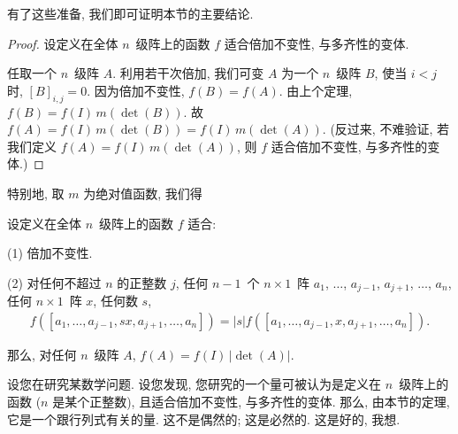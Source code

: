 \documentclass[../libro.tex]{subfiles}
\begin{document}
有了这些准备, 我们即可证明本节的主要结论.

\begin{proof}
    设定义在全体 \(n\)~级阵上的函数 \(f\)
    适合倍加不变性, 与多齐性的变体.

    任取一个 \(n\)~级阵 \(A\).
    利用若干次倍加,
    我们可变 \(A\) 为一个 \(n\)~级阵 \(B\),
    使当 \(i < j\) 时, \([B]_{i,j} = 0\).
    因为倍加不变性, \(f(B) = f(A)\).
    由上个定理, \(f(B) = f(I)\, m(\det {(B)})\).
    故 \(f(A) = f(I)\, m(\det {(B)})
    = f(I)\, m(\det {(A)})\).
    (反过来, 不难验证, 若我们定义 %
    \(f(A) = f(I)\, m(\det {(A)})\),
    则 \(f\) 适合倍加不变性, 与多齐性的变体.) %
\end{proof}

特别地, 取 \(m\) 为绝对值函数, 我们得

\begin{theorem}
    设定义在全体 \(n\)~级阵上的函数 \(f\) 适合:

    (1)
    倍加不变性.

    (2)
    对任何不超过 \(n\) 的正整数 \(j\),
    任何 \(n-1\)~个 \(n \times 1\)~阵
    \(a_1\), \(\dots\), \(a_{j-1}\),
    \(a_{j+1}\), \(\dots\), \(a_n\),
    任何 \(n \times 1\)~阵 \(x\),
    任何数 \(s\),
    \begin{align*}
        f([a_1, \dots, a_{j-1}, sx, a_{j+1}, \dots, a_n])
        = |s| f([a_1, \dots, a_{j-1}, x, a_{j+1}, \dots, a_n]).
    \end{align*}

    那么, 对任何 \(n\)~级阵 \(A\),
    \(f(A) = f(I)\, |{\det {(A)}}|\).
\end{theorem}

设您在研究某数学问题.
设您发现, 您研究的一个量可被认为是定义在 \(n\)~级阵上的函数
(\(n\) 是某个正整数),
且适合倍加不变性, 与多齐性的变体.
那么, 由本节的定理, 它是一个跟行列式有关的量.
这不是偶然的; 这是必然的.
这是好的, 我想.

\end{document}
